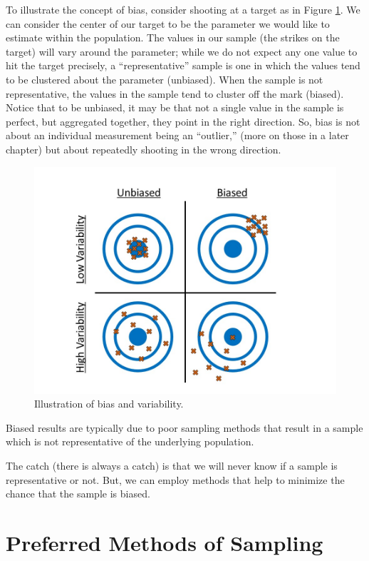\documentclass[]{book}
\theoremstyle{definition}
\theoremstyle{definition}
\theoremstyle{remark}
\let\BeginKnitrBlock\begin \let\EndKnitrBlock\end
\begin{document}
To illustrate the concept of bias, consider shooting at a target as in
Figure \ref{fig:data-bias}. We can consider the center of our target to
be the parameter we would like to estimate within the population. The
values in our sample (the strikes on the target) will vary around the
parameter; while we do not expect any one value to hit the target
precisely, a ``representative'' sample is one in which the values tend
to be clustered about the parameter (unbiased). When the sample is not
representative, the values in the sample tend to cluster off the mark
(biased). Notice that to be unbiased, it may be that not a single value
in the sample is perfect, but aggregated together, they point in the
right direction. So, bias is not about an individual measurement being
an ``outlier,'' (more on those in a later chapter) but about repeatedly
shooting in the wrong direction.

\begin{figure}

{\centering \includegraphics[width=0.8\linewidth]{./images/Data-Bias} 

}

\caption{Illustration of bias and variability.}\label{fig:data-bias}
\end{figure}

\BeginKnitrBlock{rmdkeyidea}
Biased results are typically due to poor sampling methods that result in
a sample which is not representative of the underlying population.
\EndKnitrBlock{rmdkeyidea}

The catch (there is always a catch) is that we will never know if a
sample is representative or not. But, we can employ methods that help to
minimize the chance that the sample is biased.

\section{Preferred Methods of
Sampling}\label{preferred-methods-of-sampling}
\end{document}
